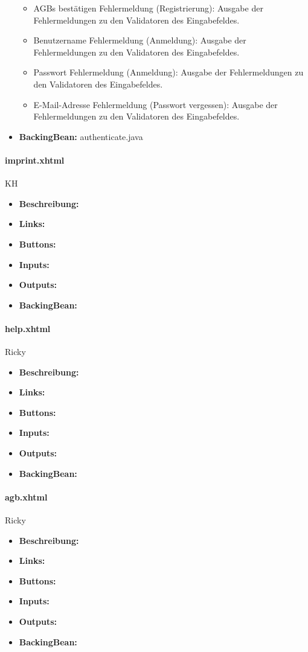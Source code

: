 \begin{itemize}
\begin{itemize}
							\item AGBs bestätigen Fehlermeldung (Registrierung): Ausgabe der Fehlermeldungen zu den Validatoren des Eingabefeldes.
							\item Benutzername Fehlermeldung (Anmeldung): Ausgabe der Fehlermeldungen zu den Validatoren des Eingabefeldes.
							\item Passwort Fehlermeldung (Anmeldung): Ausgabe der Fehlermeldungen zu den Validatoren des Eingabefeldes.
							\item E-Mail-Adresse Fehlermeldung (Passwort vergessen): Ausgabe der Fehlermeldungen zu den Validatoren des Eingabefeldes.
						\end{itemize}
					\item \textbf{BackingBean:} authenticate.java
				\end{itemize}
				
				\paragraph{imprint.xhtml}
					KH\\
					\begin{itemize}
						\item \textbf{Beschreibung:}
						\item \textbf{Links:}
						\item \textbf{Buttons:}
						\item \textbf{Inputs:}
						\item \textbf{Outputs:}
						\item \textbf{BackingBean:}
					\end{itemize}
				
				
				\paragraph{help.xhtml}
				Ricky
					\begin{itemize}
						\item \textbf{Beschreibung:}
						\item \textbf{Links:}
						\item \textbf{Buttons:}
						\item \textbf{Inputs:}
						\item \textbf{Outputs:}
						\item \textbf{BackingBean:}
					\end{itemize}
				
				\paragraph{agb.xhtml}
				Ricky
					\begin{itemize}
						\item \textbf{Beschreibung:}
						\item \textbf{Links:}
						\item \textbf{Buttons:}
						\item \textbf{Inputs:}
						\item \textbf{Outputs:}
						\item \textbf{BackingBean:}
					\end{itemize}
		
